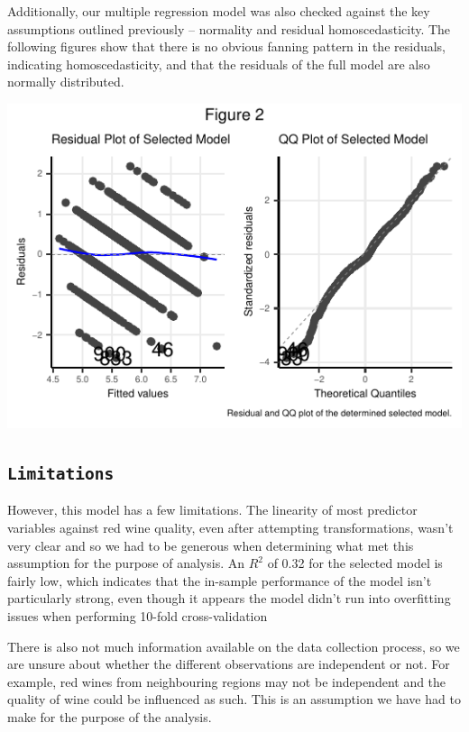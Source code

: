 \documentclass[letterpaper,8pt,twocolumn,twoside,]{pinp}
\begin{document}
Additionally, our multiple regression model was also checked against the
key assumptions outlined previously -- normality and residual
homoscedasticity. The following figures show that there is no obvious
fanning pattern in the residuals, indicating homoscedasticity, and that
the residuals of the full model are also normally distributed.

\begin{center}\includegraphics{pinp_files/figure-latex/unnamed-chunk-3-1} \end{center}

\hypertarget{limitations}{%
\subsection{\texorpdfstring{\texttt{Limitations}}{Limitations}}\label{limitations}}

However, this model has a few limitations. The linearity of most
predictor variables against red wine quality, even after attempting
transformations, wasn't very clear and so we had to be generous when
determining what met this assumption for the purpose of analysis. An
\(R^2\) of 0.32 for the selected model is fairly low, which indicates
that the in-sample performance of the model isn't particularly strong,
even though it appears the model didn't run into overfitting issues when
performing 10-fold cross-validation

There is also not much information available on the data collection
process, so we are unsure about whether the different observations are
independent or not. For example, red wines from neighbouring regions may
not be independent and the quality of wine could be influenced as such.
This is an assumption we have had to make for the purpose of the
analysis.
\end{document}
